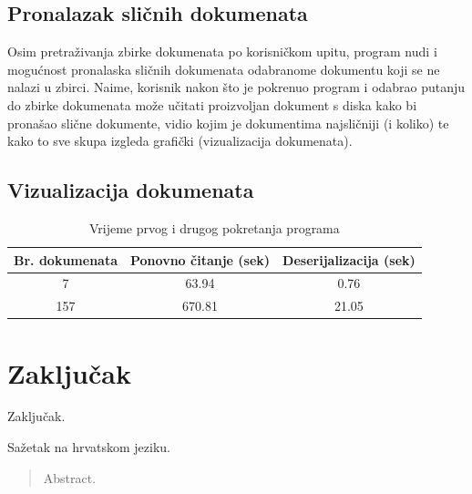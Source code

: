 \documentclass[times, utf8, zavrsni]{fer}
\begin{document}
\section{Pronalazak sličnih dokumenata}
Osim pretraživanja zbirke dokumenata po korisničkom upitu, program nudi i mogućnost pronalaska sličnih dokumenata odabranome dokumentu koji se ne nalazi u zbirci. Naime, korisnik nakon što je pokrenuo program i odabrao putanju do zbirke dokumenata može učitati proizvoljan dokument s diska kako bi pronašao slične dokumente, vidio kojim je dokumentima najsličniji (i koliko) te kako to sve skupa izgleda grafički (vizualizacija dokumenata).

\section{Vizualizacija dokumenata}

\begin{table}
\begin{center}
\begin{tabular}{|c|c|c|}
\hline
Br. dokumenata & Ponovno čitanje (sek) & Deserijalizacija (sek) \\
\hline
7 & 63.94 & 0.76 \\
157 & 670.81 & 21.05 \\
\hline
\end{tabular}
\end{center}
\caption{Vrijeme prvog i drugog pokretanja programa}
\end{table}

\chapter{Zaključak}
Zaključak.




\begin{sazetak}
Sažetak na hrvatskom jeziku.

\end{sazetak}

\begin{abstract}
Abstract.

\end{abstract}
\end{document}
